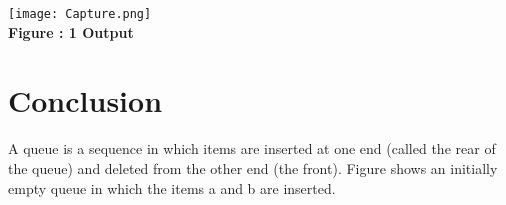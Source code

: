 \documentclass[11pt]{article}            %
\begin{document}
\begin{center}
 \texttt{[image: Capture.png]}\\ 
\textbf{Figure : 1 Output}
\vskip 0.5cm
\end{center}

\section{Conclusion}  
A queue is a sequence in which items are inserted at one end (called the rear of the queue) and deleted from the other end (the front). Figure shows an initially empty queue in which the items a and b are inserted.

 
\end{document}
